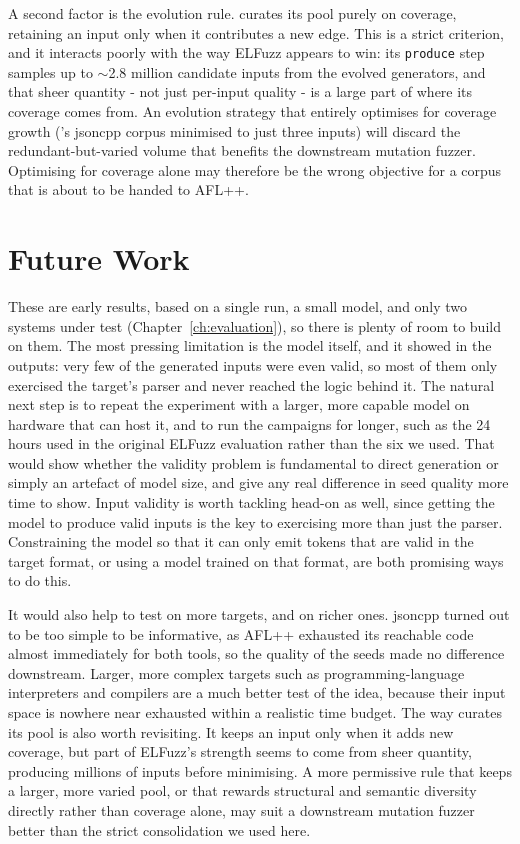 A second factor is the evolution rule. \toolname{} curates its pool purely on coverage, retaining an input only when it contributes a new edge. This is a strict criterion, and it interacts poorly with the way ELFuzz appears to win: its \texttt{produce} step samples up to $\sim$2.8 million candidate inputs from the evolved generators, and that sheer quantity - not just per-input quality - is a large part of where its coverage comes from. An evolution strategy that entirely optimises for coverage growth (\toolname{}'s jsoncpp corpus minimised to just three inputs) will discard the redundant-but-varied volume that benefits the downstream mutation fuzzer. Optimising for coverage alone may therefore be the wrong objective for a corpus that is about to be handed to AFL++.

\section{Future Work}

These are early results, based on a single run, a small model, and only two systems under test (Chapter~\ref{ch:evaluation}), so there is plenty of room to build on them. The most pressing limitation is the model itself, and it showed in the outputs: very few of the generated inputs were even valid, so most of them only exercised the target's parser and never reached the logic behind it. The natural next step is to repeat the experiment with a larger, more capable model on hardware that can host it, and to run the campaigns for longer, such as the 24 hours used in the original ELFuzz evaluation \cite{chen_2025_elfuzz} rather than the six we used. That would show whether the validity problem is fundamental to direct generation or simply an artefact of model size, and give any real difference in seed quality more time to show. Input validity is worth tackling head-on as well, since getting the model to produce valid inputs is the key to exercising more than just the parser. Constraining the model so that it can only emit tokens that are valid in the target format, or using a model trained on that format, are both promising ways to do this.

It would also help to test on more targets, and on richer ones. jsoncpp turned out to be too simple to be informative, as AFL++ exhausted its reachable code almost immediately for both tools, so the quality of the seeds made no difference downstream. Larger, more complex targets such as programming-language interpreters and compilers are a much better test of the idea, because their input space is nowhere near exhausted within a realistic time budget. The way \toolname{} curates its pool is also worth revisiting. It keeps an input only when it adds new coverage, but part of ELFuzz's strength seems to come from sheer quantity, producing millions of inputs before minimising. A more permissive rule that keeps a larger, more varied pool, or that rewards structural and semantic diversity directly rather than coverage alone, may suit a downstream mutation fuzzer better than the strict consolidation we used here.
